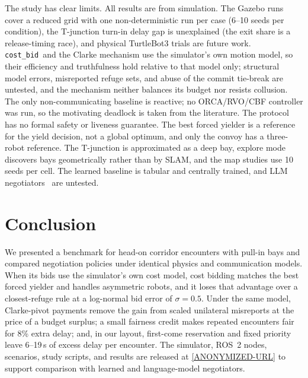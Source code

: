 \documentclass[letterpaper,journal]{IEEEtran}
\newcommand{\cb}{\texttt{cost\_bid}}
\begin{document}
The study has clear limits. All results are from simulation. The Gazebo runs cover a reduced grid with one non-deterministic run per case (6--10 seeds per condition), the T-junction turn-in delay gap is unexplained (the exit share is a release-timing race), and physical TurtleBot3 trials are future work. \cb\ and the Clarke mechanism use the simulator's own motion model, so their efficiency and truthfulness hold relative to that model only; structural model errors, misreported refuge sets, and abuse of the commit tie-break are untested, and the mechanism neither balances its budget nor resists collusion. The only non-communicating baseline is reactive; no ORCA/RVO/CBF controller was run, so the motivating deadlock is taken from the literature. The protocol has no formal safety or liveness guarantee. The best forced yielder is a reference for the yield decision, not a global optimum, and only the convoy has a three-robot reference. The T-junction is approximated as a deep bay, explore mode discovers bays geometrically rather than by SLAM, and the map studies use 10 seeds per cell. The learned baseline is tabular and centrally trained, and LLM negotiators~\cite{marlin2024,gamechat2025} are untested.

\section{Conclusion}
We presented a benchmark for head-on corridor encounters with pull-in bays and compared negotiation policies under identical physics and communication models. When its bids use the simulator's own cost model, cost bidding matches the best forced yielder and handles asymmetric robots, and it loses that advantage over a closest-refuge rule at a log-normal bid error of $\sigma=0.5$. Under the same model, Clarke-pivot payments remove the gain from scaled unilateral misreports at the price of a budget surplus; a small fairness credit makes repeated encounters fair for 8\% extra delay; and, in our layout, first-come reservation and fixed priority leave 6--19\,s of excess delay per encounter. The simulator, ROS~2 nodes, scenarios, study scripts, and results are released at \url{[ANONYMIZED-URL]} to support comparison with learned and language-model negotiators.


\enlargethispage{6\baselineskip}

\end{document}
